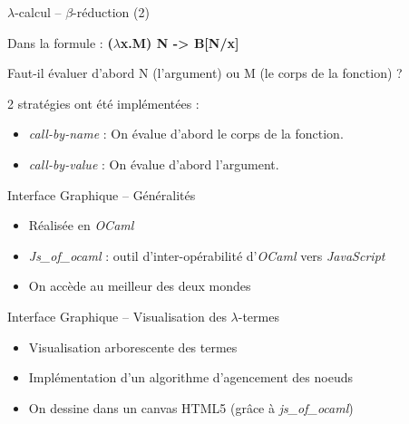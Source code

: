 \documentclass{beamer}
\begin{document}
\begin{frame}{$\lambda$-calcul -- $\beta$-réduction (2)}

    Dans la formule :
    \medskip
    \textbf{($\lambda$x.\textcolor[rgb]{1,0,0}{M}) \textcolor[rgb]{0,0,1}{N}  -> B[\textcolor[rgb]{0,0,1}{N}/x]}

    Faut-il évaluer d'abord \textcolor[rgb]{0,0,1}{N} (l'argument) ou \textcolor[rgb]{1,0,0}{M} (le corps de la fonction) ?

    \bigskip

    2 stratégies ont été implémentées :

    \begin{itemize}
    \item \textit{call-by-name} : On évalue d'abord le corps de la fonction.
    \item \textit{call-by-value} : On évalue d'abord l'argument.
    \end{itemize}

\end{frame}


\begin{frame}{Interface Graphique -- Généralités}
  \begin{itemize}
    
  \item Réalisée en \emph{OCaml} \bigskip
    
  \item \emph{Js\_of\_ocaml} : outil d'inter-opérabilité d'\emph{OCaml} vers
    \emph{JavaScript}\bigskip

  \item On accède au meilleur des deux mondes\bigskip
    
  \end{itemize}
\end{frame}

\begin{frame}{Interface Graphique -- Visualisation des $\lambda$-termes}
  \begin{itemize}
    
  \item Visualisation arborescente des termes\bigskip
    
  \item Implémentation d'un algorithme d'agencement des noeuds\bigskip

  \item On dessine dans un canvas HTML5 (grâce à
    \emph{js\_of\_ocaml})\bigskip
    
  \end{itemize}
\end{frame}
\end{document}
